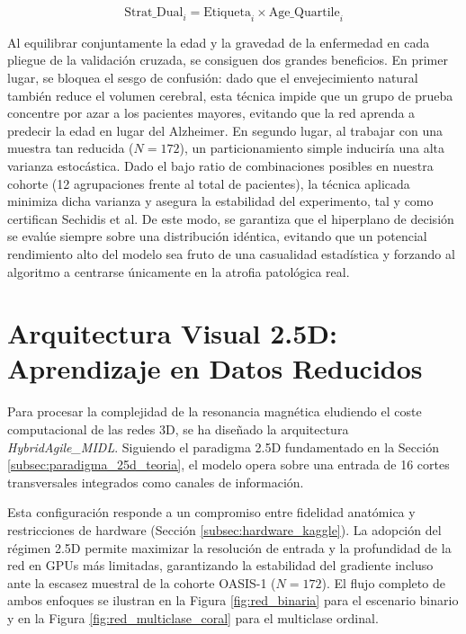 \documentclass[12pt, oneside, english, spanish]{book}
\begin{document}
\begin{equation}
	\text{Strat\_Dual}_i = \text{Etiqueta}_i \times \text{Age\_Quartile}_i
\end{equation}

Al equilibrar conjuntamente la edad y la gravedad de la enfermedad en cada pliegue de la validación cruzada, se consiguen dos grandes beneficios. En primer lugar, se bloquea el sesgo de confusión: dado que el envejecimiento natural también reduce el volumen cerebral, esta técnica impide que un grupo de prueba concentre por azar a los pacientes mayores, evitando que la red aprenda a predecir la edad en lugar del Alzheimer. En segundo lugar, al trabajar con una muestra tan reducida ($N=172$), un particionamiento simple induciría una alta varianza estocástica. Dado el bajo ratio de combinaciones posibles en nuestra cohorte (12 agrupaciones frente al total de pacientes), la técnica aplicada minimiza dicha varianza y asegura la estabilidad del experimento, tal y como certifican Sechidis et al. De este modo, se garantiza que el hiperplano de decisión se evalúe siempre sobre una distribución idéntica, evitando que un potencial rendimiento alto del modelo sea fruto de una casualidad estadística y forzando al algoritmo a centrarse únicamente en la atrofia patológica real.


\section{Arquitectura Visual 2.5D: Aprendizaje en Datos Reducidos} \label{sec:arquitectura_visual_diseno}

Para procesar la complejidad de la resonancia magnética eludiendo el coste computacional de las redes 3D, se ha diseñado la arquitectura \textit{HybridAgile\_MIDL}. Siguiendo el paradigma 2.5D fundamentado en la Sección \ref{subsec:paradigma_25d_teoria}, el modelo opera sobre una entrada de 16 cortes transversales integrados como canales de información.

Esta configuración responde a un compromiso entre fidelidad anatómica y restricciones de hardware (Sección \ref{subsec:hardware_kaggle}). La adopción del régimen 2.5D permite maximizar la resolución de entrada y la profundidad de la red en GPUs más limitadas, garantizando la estabilidad del gradiente incluso ante la escasez muestral de la cohorte OASIS-1 ($N = 172$). El flujo completo de ambos enfoques se ilustran en la Figura \ref{fig:red_binaria} para el escenario binario y en la Figura \ref{fig:red_multiclase_coral} para el multiclase ordinal.
\end{document}
